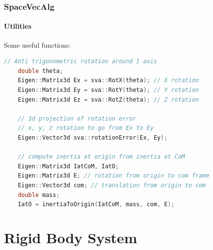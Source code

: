 \documentclass{beamer}
\begin{document}
\begin{frame}[fragile]
\frametitle{SpaceVecAlg}
\framesubtitle{Utilities}
Some useful functions:
\begin{lstlisting}[language=C++]
	// Anti trigonometric rotation around 1 axis
	double theta;
	Eigen::Matrix3d Ex = sva::RotX(theta); // X rotation
	Eigen::Matrix3d Ey = sva::RotY(theta); // Y rotation
	Eigen::Matrix3d Ez = sva::RotZ(theta); // Z rotation

	// 3d projection of rotation error
	// x, y, z rotation to go from Ex to Ey
	Eigen::Vector3d sva::rotationError(Ex, Ey);

	// compute inertia at origin from inertia at CoM
	Eigen::Matrix3d IatCoM, IatO;
	Eigen::Matrix3d E; // rotation from origin to com frame
	Eigen::Vector3d com; // translation from origin to com
	double mass;
	IatO = inertiaToOrigin(IatCoM, mass, com, E);
\end{lstlisting}
\end{frame}

\section{Rigid Body System}
\end{document}
